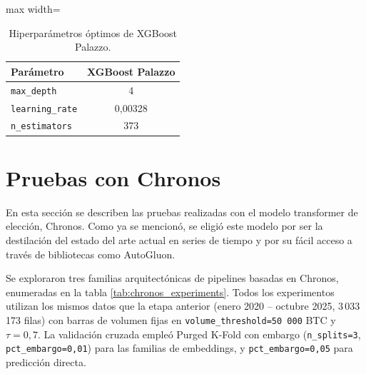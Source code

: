 \begin{table}[H]
    \centering
    \caption[Hiperparámetros óptimos XGBoost]{Hiperparámetros óptimos de XGBoost Palazzo.}
    \small
    \begin{adjustbox}{max width=\textwidth}
    \begin{tabular}{l c}
        \toprule
        \textbf{Parámetro} & \textbf{XGBoost Palazzo} \\
        \midrule
        \texttt{max\_depth}     & 4       \\
        \texttt{learning\_rate} & 0,00328 \\
        \texttt{n\_estimators}  & 373     \\
        \bottomrule
    \end{tabular}
    \end{adjustbox}
    \label{tab:ml_xgb_params}
\end{table}

\section{Pruebas con Chronos}

En esta sección se describen las pruebas realizadas con el modelo transformer de elección, Chronos. Como ya se mencionó, se eligió este modelo por ser la destilación del estado del arte actual en series de tiempo y por su fácil acceso a través de bibliotecas como AutoGluon.

Se exploraron tres familias arquitectónicas de pipelines basadas en Chronos, enumeradas en la tabla \ref{tab:chronos_experiments}. Todos los experimentos utilizan los mismos datos que la etapa anterior (enero 2020 -- octubre 2025, 3\,033\,173 filas) con barras de volumen fijas en \texttt{volume\_threshold=50\,000} BTC y $\tau=0,7$. La validación cruzada empleó Purged K-Fold con embargo (\texttt{n\_splits=3}, \texttt{pct\_embargo=0,01}) para las familias de embeddings, y \texttt{pct\_embargo=0,05} para predicción directa.

